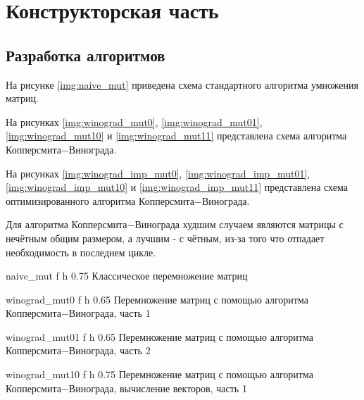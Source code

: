 \chapter{Конструкторская часть}

\section{Разработка алгоритмов}

На рисунке \ref{img:naive_mut} приведена схема стандартного алгоритма умножения матриц.

На рисунках \ref{img:winograd_mut0}, \ref{img:winograd_mut01}, \ref{img:winograd_mut10} и \ref{img:winograd_mut11} представлена схема алгоритма Копперсмита$-$Винограда.

На рисунках \ref{img:winograd_imp_mut0}, \ref{img:winograd_imp_mut01}, \ref{img:winograd_imp_mut10} и \ref{img:winograd_imp_mut11} представлена схема оптимизированного алгоритма Копперсмита$-$Винограда.

Для алгоритма Копперсмита$-$Винограда худшим случаем являются матрицы с нечётным общим размером, а лучшим - с чётным,
из-за того что отпадает необходимость в последнем цикле.

{naive_mut} %
{f} %
{h} %
{0.75\textwidth} %
{Классическое перемножение матриц} %
\clearpage

{winograd_mut0} %
{f} %
{h} %
{0.65\textwidth} %
{Перемножение матриц с помощью алгоритма Копперсмита$-$Винограда, часть 1} %
\clearpage

{winograd_mut01} %
{f} %
{h} %
{0.65\textwidth} %
{Перемножение матриц с помощью алгоритма Копперсмита$-$Винограда, часть 2} %
\clearpage

{winograd_mut10} %
{f} %
{h} %
{0.75\textwidth} %
{Перемножение матриц с помощью алгоритма Копперсмита$-$Винограда, вычисление векторов, часть 1} %
\clearpage

